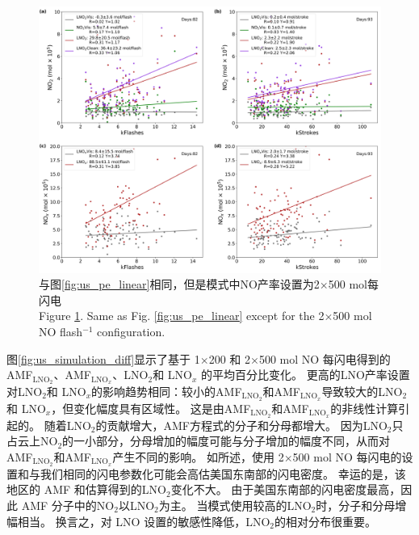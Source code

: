 \begin{figure}[!htbp]
\centering
\includegraphics[width=13cm]{./figures/us_pe_linear_2x500.png}
\caption{与图\ref{fig:us_pe_linear}相同，但是模式中NO产率设置为2$\times$500 mol每闪电 \\Figure \ref{fig:us_pe_linear_2x500}. Same as Fig. \ref{fig:us_pe_linear} except for the 2$\times$500 mol NO flash$^{-1}$ configuration.}
\label{fig:us_pe_linear_2x500}
\end{figure}

图\ref{fig:us_simulation_diff}显示了基于 1$\times$200 和 2$\times$500 mol NO 每闪电得到的AMF$_\textrm{LNO$_2$}$、AMF$_\textrm{LNO$_x$}$、LNO$_2$和 LNO$_x$ 的平均百分比变化。
更高的LNO产率设置对LNO$_2$和 LNO$_x$的影响趋势相同：较小的AMF$_\textrm{LNO$_2$}$和AMF$_\textrm{LNO$_x$}$导致较大的LNO$_2$和 LNO$_x$，但变化幅度具有区域性。
这是由AMF$_\textrm{LNO$_2$}$和AMF$_\textrm{LNO$_x$}$的非线性计算引起的。
随着LNO$_2$的贡献增大，AMF方程式的分子和分母都增大。
因为LNO$_2$只占云上NO$_2$的一小部分，分母增加的幅度可能与分子增加的幅度不同，从而对AMF$_\textrm{LNO$_2$}$和AMF$_\textrm{LNO$_x$}$产生不同的影响。
如\citet{Zhu.2019}所述，使用 2$\times$500 mol NO 每闪电的设置和与我们相同的闪电参数化可能会高估美国东南部的闪电密度。
幸运的是，该地区的 AMF 和估算得到的LNO$_2$变化不大。
由于美国东南部的闪电密度最高，因此 AMF 分子中的NO$_2$以LNO$_2$为主。
当模式使用较高的LNO$_2$时，分子和分母增幅相当。
换言之，对 LNO 设置的敏感性降低，LNO$_2$的相对分布很重要。

